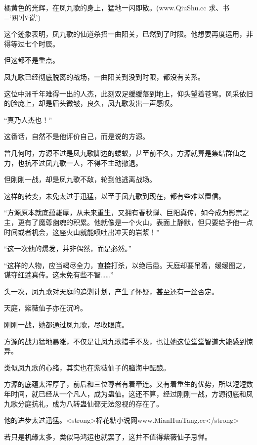 
\begin{this_body}

橘黄色的光辉，在凤九歌的身上，猛地一闪即散。(www.QiuShu.cc 求、书=‘网’小‘说’)

这个迹象表明，凤九歌的仙道杀招一曲阳关，已然到了时限。他想要再度运用，非得等过七个时辰。

但这都不是重点。

凤九歌已经彻底脱离的战场，一曲阳关到没到时限，都没有关系。

这位中洲千年难得一出的人杰，此刻双足缓缓落到地上，仰头望着苍穹。风采依旧的脸庞上，却是眉头微皱，良久，凤九歌发出一声感叹。

“真乃人杰也！”

这番话，自然不是他评价自己，而是说的方源。

曾几何时，方源不过是凤九歌脚边的蝼蚁，甚至前不久，方源就算是集结群仙之力，也抗不过凤九歌一人，不得不主动撤退。

但刚刚一战，却是凤九歌不敌，轮到他逃离战场。

这样的转变，未免太过于迅猛，以至于凤九歌到现在，都有些难以置信。

“方源原本就底蕴雄厚，从未来重生，又拥有春秋蝉、巨阳真传，如今成为影宗之主，更有了魔尊幽魂的积累。他就像是一个火山，表面上静默，但只要给予他一点时间或者机会，这座火山就能喷吐出冲天的岩浆！”

“这一次他的爆发，并非偶然，而是必然。”

“这样的人物，应当竭尽全力，直接打杀，以绝后患。天庭却要吊着，缓缓图之，谋夺红莲真传。这未免有些不智……”

头一次，凤九歌对天庭的追剿计划，产生了怀疑，甚至还有一丝否定。

天庭，紫薇仙子亦在沉吟。

刚刚一战，她都通过凤九歌，尽收眼底。

方源的战力猛地暴涨，不仅是让凤九歌措手不及，也让她这位堂堂智道大能感到惊异。

类似凤九歌的心绪，其实也在紫薇仙子的脑海中酝酿。

方源的底蕴太浑厚了，前后和三位尊者有着牵连。又有着重生的优势，所以短短数年时间，就已经从一个凡人，成为蛊仙。这还不算，经过刚刚一战，方源彻底和凤九歌分庭抗礼，成为八转蛊仙都无法忽视的存在了。

他的进步太过迅猛。<strong>棉花糖小说网www.MianHuaTang.cc</strong>

若只是机缘太多，类似马鸿运也就罢了，这并不值得紫薇仙子忌惮。


\end{this_body}
